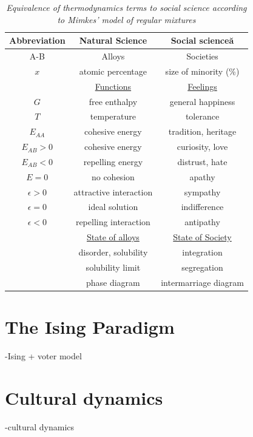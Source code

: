 \documentclass[12pt,openright,twoside]{book}
\begin{document}
\begin{table}[b]
\centering
\begin{small}
{\caption{\textit{Equivalence of thermodynamics terms to social science according to Mimkes' model of regular mixtures}}}
\begin{tabular}{ccc}

\hline\hline
Abbreviation  & Natural Science & Social science\u{a}      \\
\hline
A-B           & Alloys                  & Societies   \\
$x$           & atomic percentage       & size of minority (\%)  \\
              & \underline{Functions}   & \underline{Feelings} \\
$G$           & free enthalpy           & general happiness   \\
$T$           & temperature             & tolerance  \\
$E_{AA}$      & cohesive energy         & tradition, heritage\\
$E_{AB}>0$    & cohesive energy         & curiosity, love   \\
$E_{AB}<0$    & repelling energy        & distrust, hate  \\
$E=0$         & no cohesion             & apathy  \\
$\epsilon>0$  & attractive interaction  & sympathy  \\
$\epsilon=0$  & ideal solution          & indifference          \\
$\epsilon<0$  & repelling interaction   & antipathy  \\
              & \underline{State of alloys}         & \underline{State of Society}  \\
              & disorder, solubility    & integration  \\
              & solubility limit        & segregation  \\
              & phase diagram           & intermarriage diagram  \\

\hline
\end{tabular}
\end{small}
\end{table}

\section{The Ising Paradigm}
-Ising + voter model
\section{Cultural dynamics}
-cultural dynamics
\end{document}
